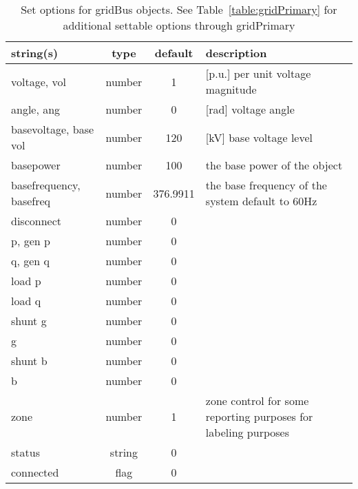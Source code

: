 \begin{table}[ht]
\centering
\begin{tabular}{p{5cm} c c p{7cm}}
\hline
string(s) & type & default & description \\
\hline
voltage, vol & number & 1 & [p.u.]    per unit voltage magnitude\\
angle, ang & number & 0 & [rad]     voltage angle\\
basevoltage, base vol & number & 120 & [kV]    base voltage level\\
basepower & number & 100 & the base power of the object\\
basefrequency, basefreq & number & 376.9911 & the base frequency of the system default to 60Hz\\
disconnect & number & 0 & \\
p, gen p & number & 0 & \\
q, gen q & number & 0 & \\
load p & number & 0 & \\
load q & number & 0 & \\
shunt g & number & 0 & \\
g & number & 0 & \\
shunt b & number & 0 & \\
b & number & 0 & \\
zone & number & 1 & zone control for some reporting purposes for labeling purposes\\
status & string & 0 & \\
connected & flag & 0 & \\
\hline
\end{tabular}
\caption{Set options for gridBus objects. See Table~\ref{table:gridPrimary} for additional settable options through gridPrimary}
\label{table:gridBus}
\end{table}

